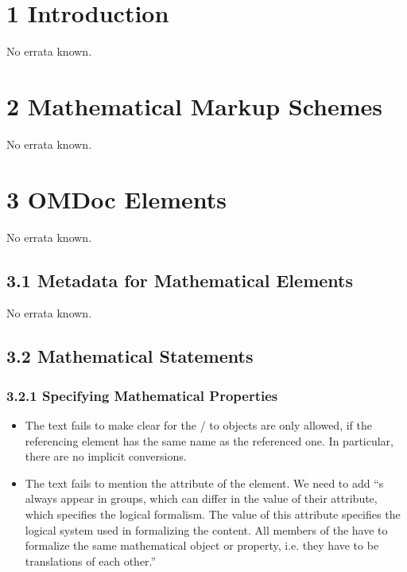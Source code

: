 \section*{1 Introduction}

No errata known.
\section*{2 Mathematical Markup Schemes}
No errata known.
\section*{3 OMDoc Elements}
No errata known.
\subsection*{3.1 Metadata for Mathematical Elements}
No errata known.

\subsection*{3.2 Mathematical Statements}

\subsubsection*{3.2.1 Specifying Mathematical Properties}
\begin{itemize}
\item The text fails to make clear for the
  {}/{} to {\openmath} objects are only
  allowed, if the referencing element has the same name as the referenced one. In
  particular, there are no implicit conversions.
  
\item The text fails to mention the {} attribute of the
  {} element. We need to add ``{}s always appear in
  groups, which can differ in the value of their {}
  attribute, which specifies the logical formalism. The value of this attribute
  specifies the logical system used in formalizing the content. All members of the
  {} have to
  formalize the same mathematical object or property, i.e. they have to be
  translations of each other.''
\end{itemize}

